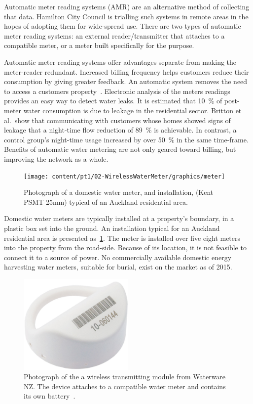   Automatic meter reading systems (AMR) are an alternative method of collecting that data.
  Hamilton City Council is trialling such systems in remote areas in the hopes of adopting them for wide-spread use.
  There are two types of automatic meter reading systems:
  an external reader/transmitter that attaches to a compatible meter, or a meter built specifically for the purpose.

  Automatic meter reading systems offer advantages separate from making the meter-reader redundant.
  Increased billing frequency helps customers reduce their consumption by giving greater feedback.
  An automatic system removes the need to access a customers property~\cite{Chang2012}.
  Electronic analysis of the meters readings provides an easy way to detect water leaks.
  It is estimated that \SI{10}{\percent} of post-meter water consumption is due to leakage in the residential sector.
  Britton et al.\ show that communicating with customers whose homes showed signs of leakage that a night-time flow reduction of \SI{89}{\percent} is achievable.
  In contrast, a control group's night-time usage increased by over \SI{50}{\percent} in the same time-frame.
  Benefits of automatic water metering are not only geared toward billing, but improving the network as a whole.

  \begin{figure}
    \centering
    \texttt{[image: content/pt1/02-WirelessWaterMeter/graphics/meter]}
    \caption{\label{fig:Photo_DomesticWaterMeter}Photograph of a domestic water meter, and installation, (Kent PSMT 25mm) typical of an Auckland residential area.}
  \end{figure}

  Domestic water meters are typically installed at a property's boundary, in a plastic box set into the ground.
  An installation typical for an Auckland residential area is presented as~\cref{fig:Photo_DomesticWaterMeter}.
  The meter is installed over five eight meters into the property from the road-side.
  Because of its location, it is not feasible to connect it to a source of power.
  No commercially available domestic energy harvesting water meters, suitable for burial, exist on the market as of 2015.

  \begin{figure}
    \centering
    \includegraphics[width=0.5\textwidth]{content/pt1/02-WirelessWaterMeter/graphics/hydro-WMBUSWLESSM}
    \caption{
      \label{fig:Photo_waterwareMeter}
      Photograph of the a wireless transmitting module from Waterware NZ.
      The device attaches to a compatible water meter and contains its own battery~\cite{BMeters2014}.
    }
  \end{figure}


